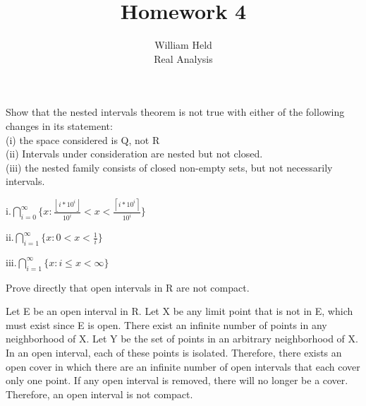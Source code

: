 \documentclass[12pt]{article}
\newenvironment{exercise}[2][Exercise]{\begin{trivlist}
\item[\hskip \labelsep {\bfseries #1}\hskip \labelsep {\bfseries #2.}]}{\end{trivlist}}
\begin{document}
 
 
 
\title{Homework 4}%
\author{William Held\\ %
Real Analysis} %

\newcommand{\norm}[1]{\left\lVert#1\right\rVert}
\newcommand{\abs}[1]{|#1|}
\newcommand{\ceil}[1]{\left \lceil #1 \right \rceil }
\newcommand{\floor}[1]{\left \lfloor #1 \right \rfloor }
\let\biconditional\leftrightarrow
\maketitle
\begin{exercise}{1.1}Show that the nested intervals theorem is not true with either of the following changes in its statement: \\
(i) the space considered is Q, not R \\
(ii) Intervals under consideration are nested but not closed. \\
(iii) the nested family consists of closed non-empty sets, but not necessarily intervals.
\end{exercise}

i.$\bigcap\limits_{i=0}^{\infty} \{x: \frac{\floor{i*10^i}}{10^i}<x<\frac{\ceil{i*10^i}}{10^i}\}$

ii.$\bigcap\limits_{i=1}^{\infty} \{x: 0<x<\frac{1}{i}\}$

iii.$\bigcap\limits_{i=1}^{\infty} \{x: i\leq x<\infty\}$
\begin{exercise}{1.2}
Prove directly that open intervals in R are not compact.
\end{exercise}
Let E be an open interval in R. Let X be any limit point that is not in E, which must exist since E is open. There exist an infinite number of points in any neighborhood of X. Let Y be the set of points in an arbitrary neighborhood of X. In an open interval, each of these points is isolated. Therefore, there exists an open cover in which there are an infinite number of open intervals that each cover only one point. If any open interval is removed, there will no longer be a cover. Therefore, an open interval is not compact.
 
\end{document}
